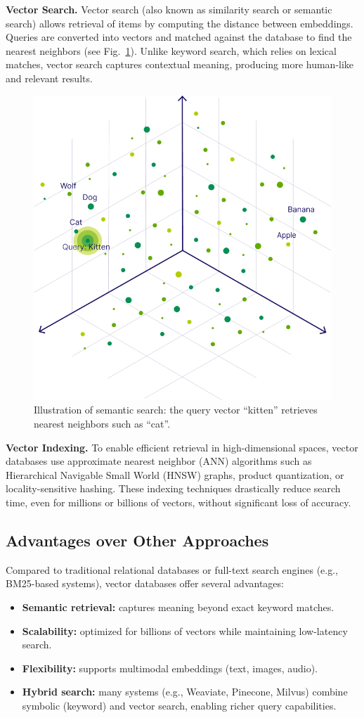 \textbf{Vector Search.}  
Vector search (also known as similarity search or semantic search) allows retrieval of items by computing the distance between embeddings. Queries are converted into vectors and matched against the database to find the nearest neighbors (see Fig.~\ref{fig:vector-search}). Unlike keyword search, which relies on lexical matches, vector search captures contextual meaning, producing more human-like and relevant results.

\begin{figure}[h]
    \centering
    \includegraphics[width=0.55\linewidth]{Images/vector-search.jpg}
    \caption{Illustration of semantic search: the query vector ``kitten'' retrieves nearest neighbors such as ``cat''.}
    \label{fig:vector-search}
\end{figure}

\textbf{Vector Indexing.}  
To enable efficient retrieval in high-dimensional spaces, vector databases use approximate nearest neighbor (\ac{ANN}) algorithms such as Hierarchical Navigable Small World (\ac{HNSW}) graphs, product quantization, or locality-sensitive hashing. These indexing techniques drastically reduce search time, even for millions or billions of vectors, without significant loss of accuracy.

\subsection{Advantages over Other Approaches}
Compared to traditional relational databases or full-text search engines (e.g., BM25-based systems), vector databases offer several advantages:
\begin{itemize}
    \item \textbf{Semantic retrieval:} captures meaning beyond exact keyword matches.
    \item \textbf{Scalability:} optimized for billions of vectors while maintaining low-latency search.
    \item \textbf{Flexibility:} supports multimodal embeddings (text, images, audio).
    \item \textbf{Hybrid search:} many systems (e.g., Weaviate, Pinecone, Milvus) combine symbolic (keyword) and vector search, enabling richer query capabilities.
\end{itemize}

